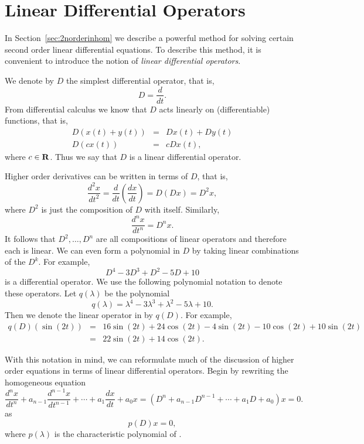 \section{Linear Differential Operators}  
\label{S:LDO}

In Section~\ref{sec:2norderinhom} we describe a powerful method for 
solving certain second order linear differential equations.  To describe 
this method, it is convenient to introduce the notion of {\em linear 
differential operators}.

We denote by $D$ the simplest differential 
operator, that is,
\[
D=\frac{d}{dt}.
\]
From differential calculus we know that $D$ acts linearly on 
(differentiable) functions, that is,
\begin{eqnarray*}
D(x(t)+y(t)) & = & Dx(t) + Dy(t) \\
D(cx(t)) & = & cDx(t),
\end{eqnarray*}
where $c\in\mbox{$\bf{R}$}$.  Thus we say that $D$ is a linear differential operator.

Higher order derivatives can be written in terms of $D$, that is,
\[
\frac{d^2x}{dt^2} = \frac{d}{dt}\left(\frac{dx}{dt}\right) = D(Dx) = D^2x,
\]
where $D^2$ is just the composition of $D$ with itself.  Similarly, 
\[
\frac{d^nx}{dt^n} = D^nx.
\]
It follows that $D^2,\ldots,D^n$ are all compositions of linear operators
and therefore each is linear.  We can even form a polynomial in $D$ by taking
linear combinations of the $D^k$.  For example,
\begin{equation}  \label{E:pdo}
D^4 - 3D^3 + D^2 -5D + 10 
\end{equation}
is a differential operator.  
We use the following polynomial notation to 
denote these operators.  Let $q(\lambda)$ be the polynomial
\[
q(\lambda) = \lambda^4 -3\lambda^3 + \lambda^2 - 5\lambda +10.
\]
Then we denote the linear operator in  by $q(D)$.  For example,
\begin{eqnarray*}
q(D)(\sin(2t)) & = & 16\sin(2t) + 24\cos(2t) - 4\sin(2t) - 10\cos(2t) + 
10\sin(2t) \\ & = & 22\sin(2t) + 14\cos(2t).
\end{eqnarray*}


With this notation in mind, we can reformulate much of the discussion of 
higher order equations in terms of linear differential operators.  Begin by 
rewriting the homogeneous equation  
\[
\frac{d^nx}{dt^n}+a_{n-1}\frac{d^{n-1}x}{dt^{n-1}}+\cdots+
a_1\frac{dx}{dt}+a_0x = (D^n+a_{n-1}D^{n-1}+\cdots+a_1D+a_0)x = 0.
\]
as
\begin{equation}  \label{E:opern2}
p(D)x = 0,
\end{equation}
where $p(\lambda)$ is the characteristic 
polynomial 
of .

